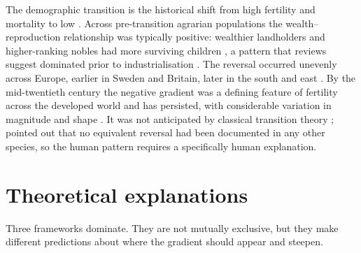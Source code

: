 \documentclass[12pt,a4paper]{report}
\begin{document}
The demographic transition is the historical shift from high fertility and mortality to low
\citep{notestein1945,caldwell1976}. Across pre-transition agrarian populations the
wealth--reproduction relationship was typically positive: wealthier landholders and
higher-ranking nobles had more surviving children \citep{boone1986,voland1990,pettay2005}, a
pattern that reviews suggest dominated prior to industrialisation
\citep{hopcroft2006,nettlepollet2008}. The reversal occurred unevenly across Europe, earlier in
Sweden and Britain, later in the south and east \citep{dribe2014,goodman2012,colemansalt1992}. By the
mid-twentieth century the negative gradient was a defining feature of fertility across the
developed world and has persisted, with considerable variation in magnitude and shape
\citep{skirbekk2008,andersson2009}. It was not anticipated by classical transition
theory \citep{mason1997}; \citet{vining1986} pointed out that no equivalent reversal had been
documented in any other species, so the human pattern requires a specifically human explanation.

\section{Theoretical explanations}
Three frameworks dominate. They are not mutually exclusive, but they make different predictions
about where the gradient should appear and steepen.
\end{document}
